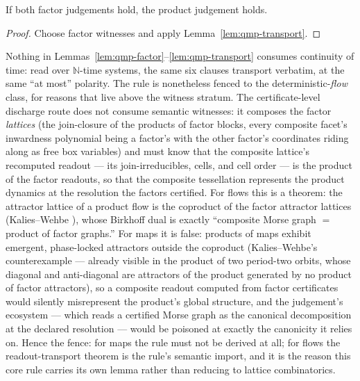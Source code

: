 \begin{bthm}
\label{thm:qmp-sound}
If both factor judgements hold, the product judgement holds.
\end{bthm}
\begin{proof}
Choose factor witnesses and apply Lemma~\ref{lem:qmp-transport}.
\end{proof}

\begin{bremark}\label{rem:qmp-fence}
Nothing in Lemmas~\ref{lem:qmp-factor}--\ref{lem:qmp-transport}
consumes continuity of time: read over $\mathbb{N}$-time systems, the
same six clauses transport verbatim, at the same ``at most'' polarity.
The rule is nonetheless fenced to the deterministic-\emph{flow} class,
for reasons that live above the witness stratum. The certificate-level
discharge route does not consume semantic witnesses: it composes the
factor \emph{lattices} (the join-closure of the products of factor
blocks, every composite facet's inwardness polynomial being a factor's
with the other factor's coordinates riding along as free box
variables) and must know that the composite lattice's recomputed
readout --- its join-irreducibles, cells, and cell order --- is the
product of the factor readouts, so that the composite tessellation
represents the product dynamics at the resolution the factors
certified. For flows this is a theorem: the attractor lattice of a
product flow is the coproduct of the factor attractor lattices
(Kalies--Wehbe \cite{kalieswehbe2026}), whose Birkhoff dual
\cite{birkhoff1937} is exactly ``composite Morse graph $=$ product of
factor graphs.'' For maps it is false: products of maps exhibit
emergent, phase-locked attractors outside the coproduct
(Kalies--Wehbe's counterexample --- already visible in the product of
two period-two orbits, whose diagonal and anti-diagonal are attractors
of the product generated by no product of factor attractors), so a
composite readout computed from factor certificates would silently
misrepresent the product's global structure, and the judgement's
ecosystem --- which reads a certified Morse graph as the canonical
decomposition at the declared resolution --- would be poisoned at
exactly the canonicity it relies on. Hence the fence: for maps the
rule must not be derived at all; for flows the readout-transport
theorem is the rule's semantic import, and it is the reason this core
rule carries its own lemma rather than reducing to lattice
combinatorics.
\end{bremark}

